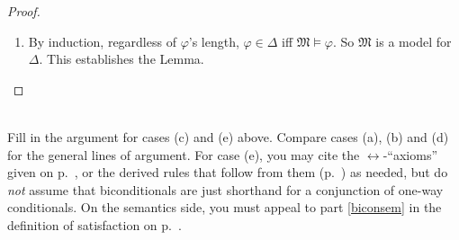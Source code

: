 \documentclass[12pt]{report}
\theoremstyle{nonumberplain}
\newtheorem{proof}{Proof}
\newcounter{hwex}
\newenvironment{hw}{\refstepcounter{hwex}\bigskip\noindent\fbox{\textsc{~Homework~\arabic{hwex}~}}\\[0.2\baselineskip]
\noindent}{}
\newcommand{\M}{\mathfrak{M}}
\newcommand{\Val}{\mathrm{Val}}
\newcommand{\ValMsp}{\Val^{\M}_{s^{\prime}}}
\begin{document}
\begin{proof}
\begin{enumerate}
\begin{enumerate}[label={Case (\alph*):}]
First we prove that if $φ ∈Δ$ then $\M ⊨ φ$.
\begin{itemize}[nolistsep,leftmargin=*]
\item Suppose $φ ∈Δ$, i.e., $∃x ψ (x) ∈ Δ$.
\item It cannot be that $¬ψ(t) ∈ Δ$ for all closed terms $t$. For if this were true, then, because $Δ$ is universal, $∀x¬ψ(x)∈Δ$, hence $Δ⊢¬∃xψ(x) $ by CQ and MP, and then $Δ ⊢ ⊥$, which is impossible.
\item Hence for some closed term $t$, $¬ψ(t) ∉ Δ$  and therefore $ψ(t) ∈ Δ$.
\item By the inductive hypothesis, $\M ⊨ ψ(t)$. Hence for any variable assignment $s$, $\M, s ⊨ ∃xψ(x)$, since for the $s^\prime$ differing from $s$ in assigning $t$ to $x$, $\M, s^{\prime} ⊨ ψ(x)$.
\item Therefore $\M ⊨ ∃xψ(x)$, i.e., $\M ⊨ φ$.
\end{itemize}
Now we prove that if $\M ⊨ φ$ then $φ∈Δ$.
\begin{itemize}[nolistsep,leftmargin=*]
\item Suppose $\M ⊨ φ$, i.e., $\M ⊨ ∃xψ(x)$.
\item For any assigment $s$, there is one differing from it $s^{\prime}$ at its assignment to $x$ that satisfies $ψ(x)$. Because the domain of quantification is the set of closed terms, $\ValMsp(x) = t$ for some closed term. Clearly, $\M, s^{\prime} ⊢ ψ(t)$ as well, and because $ψ(t)$ is closed, $\M ⊨ ψ(t)$.
\item By the inductive hypothesis, $ψ(t) ∈ Δ$.
\item By EG, $Δ ⊢ ∃xψ(x)$, and by closure, $∃xψ(x) ∈ Δ$, i.e., $φ∈Δ$
\end{itemize}

\end{enumerate}

\item By induction, regardless of $φ$'s length, $φ ∈Δ$ iff $\M ⊨ φ$. So $\M$ is a model for $Δ$. This establishes the Lemma.
\end{enumerate}
\end{proof}
\begin{hw}
Fill in the argument for cases (c) and (e) above. Compare cases (a), (b) and (d) for the general lines of argument. For case (e), you may cite the $↔$-``axioms'' given on p.~\pageref{equiv:axs}, or the derived rules that follow from them (p.~\pageref{equiv:rules}) as needed, but do \emph{not} assume that biconditionals are just shorthand for a conjunction of one-way conditionals. On the semantics side, you must appeal to part \ref{biconsem} in the definition of satisfaction on p.~\pageref{biconsem}.
\end{hw}
\end{document}
